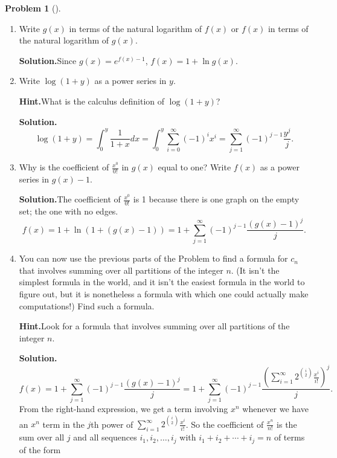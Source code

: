 \documentclass[10pt,]{book}
\theoremstyle{plain}
\theoremstyle{definition}
\newtheorem{activity}[project]{Problem}
\theoremstyle{definition}
\numberwithin{equation}{chapter}
\begin{document}
\begin{activity}[]
\begin{enumerate}[font=\bfseries,label=(\alph*),ref=\alph*]
\item\label{task-267} Write \(g(x)\) in terms of the natural logarithm of \(f(x)\) or \(f(x)\) in terms of the natural logarithm of  \(g(x)\).%
\par\medskip\noindent%
\textbf{Solution.}\quad Since \(g(x) = e^{f(x)-1}\), \(f(x) = 1+ \ln g(x)\).%
\item\label{task-268} Write \(\log(1+y)\) as a power series in \(y\).%
\par\medskip\noindent%
\textbf{Hint.}\quad What is the calculus definition of \(\log(1+y)\)?%
\par\medskip\noindent%
\textbf{Solution.}\quad %
\begin{equation*}
\log(1+y)=\int_0^y \frac{1}{1+x}dx =\int_0^y \sum_{i=0}^\infty
(-1)^ix^i = \sum_{j=1}^\infty (-1)^{j-1}\frac{y^j}{j}.
\end{equation*}
%
\item\label{task-269} Why is the coefficient of \(\frac{x^0}{0!}\) in \(g(x)\) equal to one?  Write \(f(x)\) as a power series in \(g(x) -1\).%
\par\medskip\noindent%
\textbf{Solution.}\quad The coefficient of \(\frac{x^0}{0!}\) is 1 because there is one graph on the empty set; the one with no edges.%
\begin{equation*}
f(x) = 1 +\ln(1 +
(g(x)-1))=1+\sum_{j=1}^\infty (-1)^{j-1}\frac{(g(x)-1)^j}{j}.
\end{equation*}
%
\item\label{task-270} You can now use the previous parts of the Problem to find a formula for \(c_n\) that involves summing over all partitions of the integer \(n\). (It isn't the simplest formula in the world, and it isn't the easiest formula in the world to figure out, but it is nonetheless a formula with which one could actually make computations!)  Find such a  formula.%
\par\medskip\noindent%
\textbf{Hint.}\quad Look for a formula that involves summing over all partitions of the integer \(n\).%
\par\medskip\noindent%
\textbf{Solution.}\quad %
\begin{equation*}
f(x) = 1+\sum_{j=1}^\infty
(-1)^{j-1}\frac{(g(x)-1)^j}{j}= 1+\sum_{j=1}^\infty
(-1)^{j-1}\frac{(\sum_{i=1}^\infty 2^{\binom{i}{2}}\frac{x^i}{i!})^j}{j}.
\end{equation*}
From the right-hand expression, we get a term involving \(x^n\) whenever we have an \(x^n\) term in the \(j\)th power of \(\sum_{i=1}^\infty 2^{\binom{i}{2}}\frac{x^i}{i!}\). So the coefficient of \(\frac{x^n}{n!}\) is the sum over all \(j\) and all sequences \(i_1,i_2,\ldots,i_j\) with \(i_1+i_2+\cdots+i_j = n\) of terms of the form%

\end{enumerate}
\end{activity}
\end{document}
